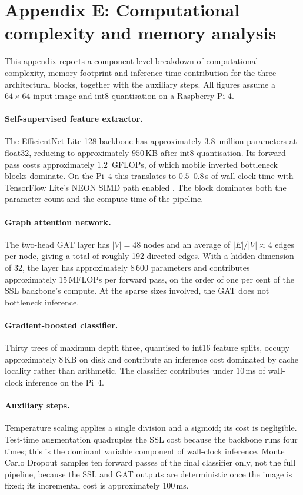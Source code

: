 \documentclass[twocolumn,10pt]{article}
\begin{document}
\section*{Appendix E: Computational complexity and memory
analysis}
\label{app:complexity}
This appendix reports a component-level breakdown of
computational complexity, memory footprint and inference-time
contribution for the three architectural blocks, together with
the auxiliary steps. All figures assume a $64\times 64$ input
image and int8 quantisation on a Raspberry Pi 4.

\paragraph{Self-supervised feature extractor.}
The EfficientNet-Lite-128 backbone has approximately
$3.8$~million parameters at float32, reducing to approximately
$950$\,KB after int8 quantisation. Its forward pass costs
approximately $1.2$~GFLOPs, of which mobile inverted bottleneck
blocks dominate. On the Pi~4 this translates to $0.5$--$0.8$\,s
of wall-clock time with TensorFlow Lite's NEON SIMD path enabled
\cite{TFLite2022}. The block dominates both the parameter count
and the compute time of the pipeline.

\paragraph{Graph attention network.}
The two-head GAT layer has $|V| = 48$ nodes and an average of
$|E|/|V| \approx 4$ edges per node, giving a total of roughly
192 directed edges. With a hidden dimension of 32, the layer has
approximately $8\,600$ parameters and contributes approximately
$15$\,MFLOPs per forward pass, on the order of one per cent of
the SSL backbone's compute. At the sparse sizes involved, the
GAT does not bottleneck inference.

\paragraph{Gradient-boosted classifier.}
Thirty trees of maximum depth three, quantised to int16 feature
splits, occupy approximately $8$\,KB on disk and contribute an
inference cost dominated by cache locality rather than
arithmetic. The classifier contributes under $10$\,ms of
wall-clock inference on the Pi~4.

\paragraph{Auxiliary steps.}
Temperature scaling applies a single division and a sigmoid;
its cost is negligible. Test-time augmentation quadruples the
SSL cost because the backbone runs four times; this is the
dominant variable component of wall-clock inference. Monte
Carlo Dropout samples ten forward passes of the final
classifier only, not the full pipeline, because the SSL and
GAT outputs are deterministic once the image is fixed; its
incremental cost is approximately $100$\,ms.
\end{document}

